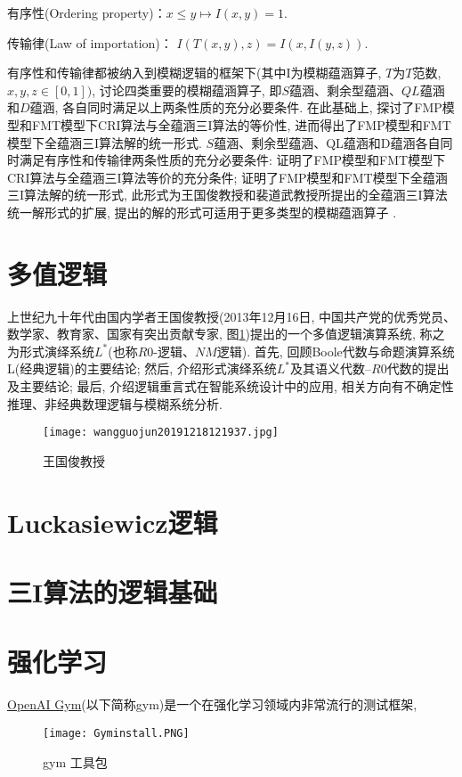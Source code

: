 有序性(Ordering property)：$ x\leq y\longmapsto I(x,y)=1$.

传输律(Law of importation)： $I(T(x,y),z)=I(x,I(y,z))$.

有序性和传输律都被纳入到模糊逻辑的框架下(其中I为模糊蕴涵算子, $T$为$T$范数, $x,y,z\in [0,1])$, 讨论四类重要的模糊蕴涵算子, 即$S$蕴涵、剩余型蕴涵、$QL$蕴涵和$D$蕴涵, 各自同时满足以上两条性质的充分必要条件.
在此基础上, 探讨了FMP模型和FMT模型下CRI算法与全蕴涵三I算法的等价性, 进而得出了FMP模型和FMT模型下全蕴涵三I算法解的统一形式.
$S$蕴涵、剩余型蕴涵、QL蕴涵和D蕴涵各自同时满足有序性和传输律两条性质的充分必要条件: 证明了FMP模型和FMT模型下CRI算法与全蕴涵三I算法等价的充分条件;
证明了FMP模型和FMT模型下全蕴涵三I算法解的统一形式, 此形式为王国俊教授和裴道武教授所提出的全蕴涵三I算法统一解形式的扩展, 提出的解的形式可适用于更多类型的模糊蕴涵算子 .
\section{多值逻辑}
上世纪九十年代由国内学者王国俊教授(2013年12月16日, 中国共产党的优秀党员、数学家、教育家、国家有突出贡献专家, 图\ref{wangguojun20191218121937})提出的一个多值逻辑演算系统, 称之为形式演绎系统$L^*$(也称$R0$-逻辑、$NM$逻辑). 首先, 回顾Boole代数与命题演算系统L(经典逻辑)的主要结论; 然后, 介绍形式演绎系统$L^*$及其语义代数--$R0$代数的提出及主要结论; 最后, 介绍逻辑重言式在智能系统设计中的应用, 相关方向有不确定性推理、非经典数理逻辑与模糊系统分析.
\begin{figure}[H]
\centering
\texttt{[image: wangguojun20191218121937.jpg]}
\caption{王国俊教授}
\label{wangguojun20191218121937}
\end{figure}
\section{Luckasiewicz逻辑}
\section{三I算法的逻辑基础}
\section{强化学习}
\href{https://gym.openai.com/}{OpenAI Gym}(以下简称gym)是一个在强化学习领域内非常流行的测试框架,
\begin{figure}[H]
\centering
\texttt{[image: Gyminstall.PNG]}
\caption{gym 工具包}
\label{Gyminstall}
\end{figure}

